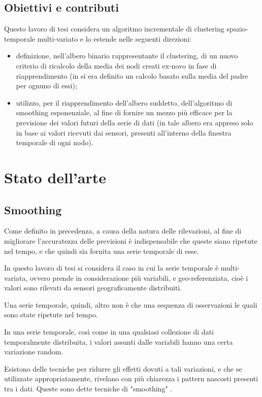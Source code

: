 \documentclass[12pt,a4paper,twoside,openright]{book}
\begin{document}
\section{Obiettivi e contributi}
Questo lavoro di tesi considera un algoritmo incrementale di clustering spazio-temporale multi-variato e lo estende nelle seguenti direzioni: 
\begin{itemize}
\item definizione, nell’albero binario rappresentante il clustering, di un nuovo criterio di ricalcolo della media dei nodi creati ex-novo in fase di riapprendimento (in \cite{donato} si era definito un calcolo basato sulla media del padre per ognuno di essi);
\item utilizzo, per il riapprendimento dell’albero suddetto, dell’algoritmo di smoothing esponenziale, al fine di fornire un mezzo più efficace per la previsione dei valori futuri della serie di dati (in \cite{donato} tale albero era appreso solo in base ai valori ricevuti dai sensori, presenti all’interno della finestra temporale di ogni nodo).
\end{itemize}
\chapter{Stato dell'arte}
\section{Smoothing}
Come definito in precedenza, a causa della natura delle rilevazioni, al fine di migliorare l'accuratezza delle previsioni è indispensabile che queste siano ripetute nel tempo, e che quindi sia fornita una serie temporale di esse.

In questo lavoro di tesi si considera il caso in cui la serie temporale è multi-variata, ovvero prende in considerazione più variabili, e geo-referenziata, cioè i valori sono rilevati da sensori geograficamente distribuiti.

Una serie temporale, quindi, altro non è che una sequenza di osservazioni le quali sono state ripetute nel tempo. 

In una serie temporale, così come in una qualsiasi collezione di dati temporalmente distribuita, i valori assunti dalle variabili hanno una certa variazione random. 

Esistono delle tecniche per ridurre gli effetti dovuti a tali variazioni, e che se utilizzate appropriatamente, rivelano con più chiarezza i pattern nascosti presenti tra i dati. Queste sono dette tecniche di "smoothing" \cite{5a}. 
\end{document}
